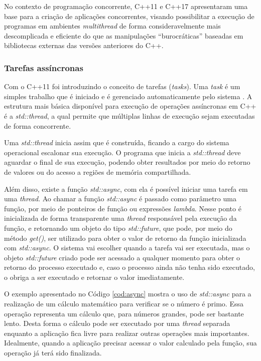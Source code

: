 No contexto de programação concorrente, C++11 e C++17 apresentaram uma base para
a criação de aplicações concorrentes, visando possibilitar a execução de
programas em ambientes \textit{multithread} de forma consideravelmente mais
descomplicada e eficiente do que as manipulações “burocráticas” baseadas em
bibliotecas externas das versões anteriores do C++.

\subsubsection{Tarefas assíncronas}

Com o C++11 foi introduzindo o conceito de tarefas (\textit{tasks}). Uma
\textit{task} é um simples trabalho que é iniciado e é gerenciado
automaticamente pelo sistema \cite{grimm_2017}. A estrutura mais básica
disponível para execução de operações assíncronas em C++ é a
\textit{std::thread}, a qual permite que múltiplas linhas de execução sejam
executadas de forma concorrente.

Uma \textit{std::thread} inicia assim que é construída, ficando a cargo do
sistema operacional escalonar sua execução. O programa que inicia a
\textit{std::thread} deve aguardar o final de sua execução, podendo obter
resultados por meio do retorno de valores ou do acesso a regiões de memória
compartilhada.

Além disso, existe a função \textit{std::async}, com ela é possível iniciar uma
tarefa em uma \textit{thread}. Ao chamar a função \textit{std::async} é passado
como parâmetro uma função, por meio de ponteiros de função ou expressões
\textit{lambda}. Nesse ponto é inicializada de forma transparente uma
\textit{thread} responsável pela execução da função, e retornando um objeto do
tipo \textit{std::future}, que pode, por meio do método \textit{get()}, ser
utilizado para obter o valor de retorno da função inicializada com
\textit{std::async}. O sistema vai escolher quando a tarefa vai ser executada,
mas o objeto \textit{std::future} criado pode ser acessado a qualquer momento
para obter o retorno do processo executado e, caso o processo ainda não tenha
sido executado, o obriga a ser executado e retornar o valor imediatamente.

O exemplo apresentado no Código \ref{cod:async} mostra o uso de
\textit{std::async} para a realização de um cálculo matemático para verificar se
o número é primo. Essa operação representa um cálculo que, para números grandes,
pode ser bastante lento. Desta forma o cálculo pode ser executado por uma
\textit{thread} separada enquanto a aplicação fica livre para realizar outras
operações mais importantes. Idealmente, quando a aplicação precisar acessar o
valor calculado pela função, sua operação já terá sido finalizada.

